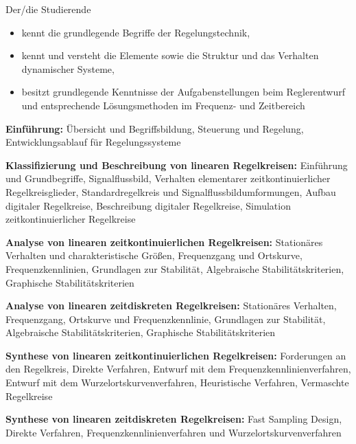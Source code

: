 \begin{course}
\begin{learningoutcomes}
Der/die Studierende

 \begin{itemize}\item kennt die grundlegende Begriffe der Regelungstechnik,  \item kennt und versteht die Elemente sowie die Struktur und das Verhalten dynamischer Systeme,  \item besitzt grundlegende Kenntnisse der Aufgabenstellungen beim Reglerentwurf und entsprechende Lösungsmethoden im Frequenz- und Zeitbereich  \end{itemize}
\end{learningoutcomes}

\begin{content}
\textbf{Einführung: }Übersicht und Begriffsbildung, Steuerung und Regelung, Entwicklungsablauf für Regelungssysteme

 

\textbf{Klassifizierung und Beschreibung von linearen Regelkreisen: }Einführung und Grundbegriffe, Signalflussbild, Verhalten elementarer zeitkontinuierlicher Regelkreisglieder, Standardregelkreis und Signalflussbildumformungen, Aufbau digitaler Regelkreise, Beschreibung digitaler Regelkreise, Simulation zeitkontinuierlicher Regelkreise

 

\textbf{Analyse von linearen zeitkontinuierlichen Regelkreisen: }Stationäres Verhalten und charakteristische Größen, Frequenzgang und Ortskurve, Frequenzkennlinien, Grundlagen zur Stabilität, Algebraische Stabilitätskriterien, Graphische Stabilitätskriterien

 

\textbf{Analyse von linearen zeitdiskreten Regelkreisen: }Stationäres Verhalten, Frequenzgang, Ortskurve und Frequenzkennlinie, Grundlagen zur Stabilität, Algebraische Stabilitätskriterien, Graphische Stabilitätskriterien

 

\textbf{Synthese von linearen zeitkontinuierlichen Regelkreisen: }Forderungen an den Regelkreis, Direkte Verfahren, Entwurf mit dem Frequenzkennlinienverfahren, Entwurf mit dem Wurzelortskurvenverfahren, Heuristische Verfahren, Vermaschte Regelkreise

 

\textbf{Synthese von linearen zeitdiskreten Regelkreisen: }Fast Sampling Design, Direkte Verfahren, Frequenzkennlinienverfahren und Wurzelortskurvenverfahren


\end{content}
\end{course}
